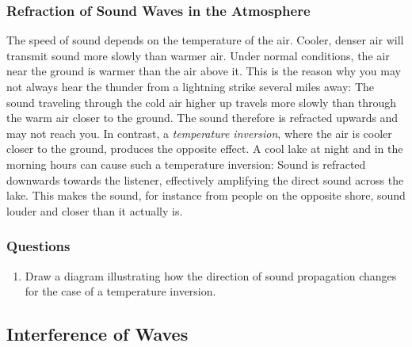\documentclass[11pt]{NSF}
\def\ben{\begin{enumerate}}
\def\een{\end{enumerate}}
\def\i{\item{}}
\begin{document}
\subsubsection{Refraction of Sound Waves in the Atmosphere}

The speed of sound depends on the temperature of the air. Cooler, denser air
will transmit sound more slowly than warmer air. Under normal conditions, the
air near the ground is warmer than the air above it. This is the reason why you
may not always hear the thunder from a lightning strike several miles away: The
sound traveling through the cold air higher up travels more slowly than through
the warm air closer to the ground. The sound therefore is refracted upwards and
may not reach you. In contrast, a {\em temperature inversion}, where the air is
cooler closer to the ground, produces the opposite effect. A cool lake at night
and in the morning hours can cause such a temperature inversion: Sound is
refracted downwards towards the listener, effectively amplifying the direct
sound across the lake. This makes the sound, for instance from people on the
opposite shore, sound louder and closer than it actually is.

\subsubsection*{Questions}
\ben
\i Draw a diagram illustrating how the direction of sound propagation changes
for the case of a temperature inversion.

\een

\subsection{Interference of Waves}
\end{document}
